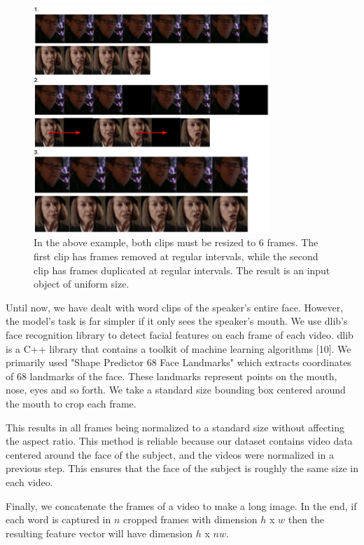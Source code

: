 \documentclass{article}
\begin{document}
   \begin{figure}[h!]
 \centering
  \includegraphics[width=0.8\textwidth]{sampling}
 \caption{In the above example, both clips must be resized to 6 frames. The first clip has frames removed at regular intervals, while the second clip has frames duplicated at regular intervals. The result is an input object of uniform size.}
 \end{figure}

Until now, we have dealt with word clips of the speaker's entire face. However, the model's task is far simpler if it only sees the speaker's mouth. We use dlib's face recognition library to detect facial features on each frame of each video. dlib is a C++ library that contains a toolkit of machine learning algorithms [10]. We primarily used "Shape Predictor 68 Face Landmarks" which extracts coordinates of 68 landmarks of the face. These landmarks represent points on the mouth, nose, eyes and so forth. We take a standard size bounding box centered around the mouth to crop each frame. 

This results in all frames being normalized to a standard size without affecting the aspect ratio. This method is reliable because our dataset contains video data centered around the face of the subject, and the videos were normalized in a previous step. This ensures that the face of the subject is roughly the same size in each video.

Finally, we concatenate the frames of a video to make a long image. In the end, if each word is captured in $n$ cropped frames with dimension $h$ x $w$ then the resulting feature vector will have dimension $h$ x $nw$.
\end{document}
